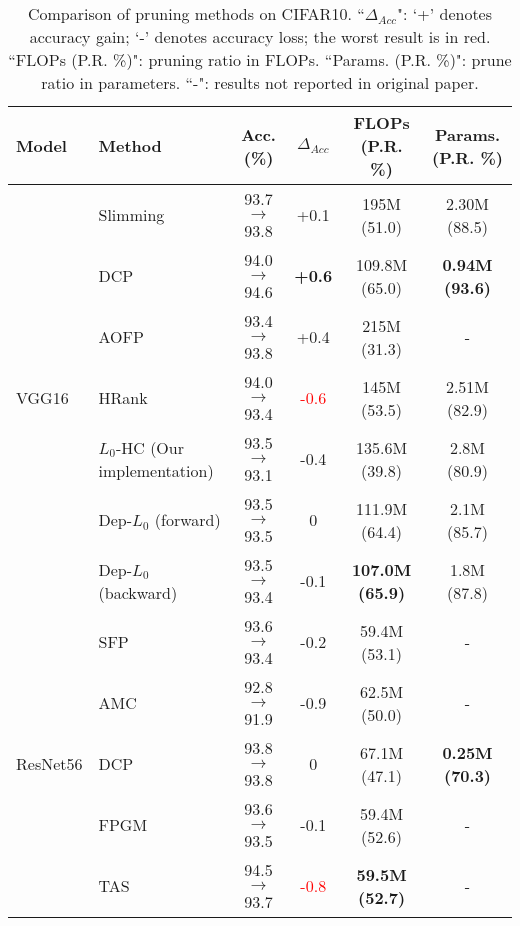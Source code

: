 \documentclass[runningheads, envcountsame, a4paper]{llncs}
\begin{document}
\begin{table}[ht]
  \small
  \centering
  \caption{Comparison of pruning methods on CIFAR10. ``$\Delta_{Acc}$": `+' denotes accuracy gain; `-' denotes accuracy loss; the worst result is in red. ``FLOPs (P.R. \%)": pruning ratio in FLOPs. ``Params. (P.R. \%)": prune ratio in parameters. ``-": results not
   reported in original paper.}%
  \begin{tabular}{l l c c c c}\toprule
      Model & Method & Acc. (\%) & $\Delta_{Acc}$ & FLOPs (P.R. \%) & Params. (P.R. \%) \\\hline
      \multirow{7}{*}{VGG16} & Slimming~\cite{liu2017learning} & 93.7$\rightarrow$93.8 &+0.1 &195M (51.0) & 2.30M (88.5) \\
       & DCP~\cite{zhuang2018discrimination} & 94.0$\rightarrow$94.6 & \textbf{+0.6} & 109.8M (65.0) & \textbf{0.94M (93.6)}\\
       & AOFP~\cite{ding2019approximated} & 93.4$\rightarrow$93.8 & +0.4 &215M (31.3) & -  \\
       & HRank~\cite{lin2020hrank} & 94.0$\rightarrow$93.4 &\textcolor{red}{-0.6} & 145M (53.5) & 2.51M (82.9)\\
       & \cellcolor{blue!25}$L_0$-HC (Our implementation) & \cellcolor{blue!25}93.5$\rightarrow$93.1  & \cellcolor{blue!25}-0.4 & \cellcolor{blue!25}135.6M (39.8) & \cellcolor{blue!25}2.8M (80.9) \\
       & \cellcolor{blue!25}Dep-$L_0$ (forward) & \cellcolor{blue!25}93.5$\rightarrow$93.5 & \cellcolor{blue!25}0 & \cellcolor{blue!25}111.9M (64.4) & \cellcolor{blue!25}2.1M  (85.7) \\
       & \cellcolor{blue!25}Dep-$L_0$ (backward) & \cellcolor{blue!25}93.5$\rightarrow$93.4 & \cellcolor{blue!25}-0.1 & \cellcolor{blue!25}\textbf{107.0M (65.9)} & \cellcolor{blue!25}1.8M (87.8) \\
       \hline
      \multirow{9}{*}{ResNet56} & SFP~\cite{he2018soft} & 93.6$\rightarrow$93.4 & -0.2 & 59.4M (53.1) & - \\
       & AMC~\cite{he2018amc} & 92.8$\rightarrow$91.9 & -0.9 & 62.5M (50.0) & - \\
       & DCP~\cite{zhuang2018discrimination} & 93.8$\rightarrow$93.8 & 0 &67.1M (47.1) & \textbf{0.25M (70.3)}\\ 
       & FPGM~\cite{he2019filter} & 93.6$\rightarrow$93.5 & -0.1 & 59.4M (52.6) & - \\
       & TAS~\cite{dong2019network} & 94.5$\rightarrow$93.7 &\textcolor{red}{-0.8} & \textbf{59.5M (52.7)} & - \\

\end{tabular}
\end{table}
\end{document}
